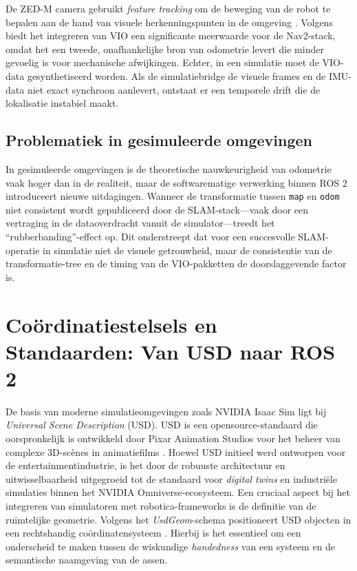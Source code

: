 De ZED-M camera gebruikt \textit{feature tracking} om de beweging van de robot te bepalen aan de hand van visuele herkenningspunten in de omgeving \autocite{Stereolabs2023}. Volgens \textcite{ONL2026} biedt het integreren van VIO een significante meerwaarde voor de Nav2-stack, omdat het een tweede, onafhankelijke bron van odometrie levert die minder gevoelig is voor mechanische afwijkingen. Echter, in een simulatie moet de VIO-data gesynthetiseerd worden. Als de simulatiebridge de visuele frames en de IMU-data niet exact synchroon aanlevert, ontstaat er een temporele drift die de lokalisatie instabiel maakt.

\subsection{Problematiek in gesimuleerde omgevingen}
In gesimuleerde omgevingen is de theoretische nauwkeurigheid van odometrie vaak hoger dan in de realiteit, maar de softwarematige verwerking binnen ROS 2 introduceert nieuwe uitdagingen. Wanneer de transformatie tussen \texttt{map} en \texttt{odom} niet consistent wordt gepubliceerd door de SLAM-stack—vaak door een vertraging in de dataoverdracht vanuit de simulator—treedt het ``rubberbanding''-effect op. Dit onderstreept dat voor een succesvolle SLAM-operatie in simulatie niet de visuele getrouwheid, maar de consistentie van de transformatie-tree en de timing van de VIO-pakketten de doorslaggevende factor is.

\section{Coördinatiestelsels en Standaarden: Van USD naar ROS 2}
\label{sec:standaarden_coordinaten}

De basis van moderne simulatieomgevingen zoals NVIDIA Isaac Sim ligt bij \textit{Universal Scene Description} (USD). USD is een opensource-standaard die oorspronkelijk is ontwikkeld door Pixar Animation Studios voor het beheer van complexe 3D-scènes in animatiefilms \autocite{Studios2021}. Hoewel USD initieel werd ontworpen voor de entertainmentindustrie, is het door de robuuste architectuur en uitwisselbaarheid uitgegroeid tot de standaard voor \textit{digital twins} en industriële simulaties binnen het NVIDIA Omniverse-ecosysteem. Een cruciaal aspect bij het integreren van simulatoren met robotica-frameworks is de definitie van de ruimtelijke geometrie. Volgens het \textit{UsdGeom}-schema positioneert USD objecten in een rechtshandig coördinatensysteem \autocite{Studios2026}. Hierbij is het essentieel om een onderscheid te maken tussen de wiskundige \textit{handedness} van een systeem en de semantische naamgeving van de assen.

